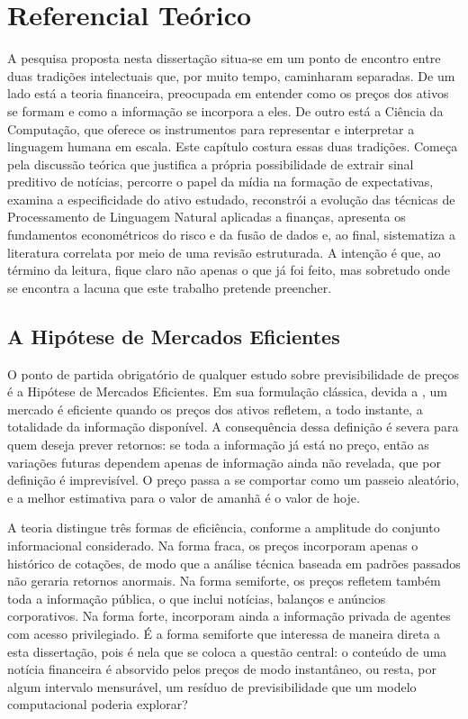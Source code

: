 \chapter{Referencial Teórico} \label{chap:referencial_teorico}

A pesquisa proposta nesta dissertação situa-se em um ponto de encontro entre duas tradições intelectuais que, por muito tempo, caminharam separadas. De um lado está a teoria financeira, preocupada em entender como os preços dos ativos se formam e como a informação se incorpora a eles. De outro está a Ciência da Computação, que oferece os instrumentos para representar e interpretar a linguagem humana em escala. Este capítulo costura essas duas tradições. Começa pela discussão teórica que justifica a própria possibilidade de extrair sinal preditivo de notícias, percorre o papel da mídia na formação de expectativas, examina a especificidade do ativo estudado, reconstrói a evolução das técnicas de Processamento de Linguagem Natural aplicadas a finanças, apresenta os fundamentos econométricos do risco e da fusão de dados e, ao final, sistematiza a literatura correlata por meio de uma revisão estruturada. A intenção é que, ao término da leitura, fique claro não apenas o que já foi feito, mas sobretudo onde se encontra a lacuna que este trabalho pretende preencher.

\section{A Hipótese de Mercados Eficientes}

O ponto de partida obrigatório de qualquer estudo sobre previsibilidade de preços é a Hipótese de Mercados Eficientes. Em sua formulação clássica, devida a , um mercado é eficiente quando os preços dos ativos refletem, a todo instante, a totalidade da informação disponível. A consequência dessa definição é severa para quem deseja prever retornos: se toda a informação já está no preço, então as variações futuras dependem apenas de informação ainda não revelada, que por definição é imprevisível. O preço passa a se comportar como um passeio aleatório, e a melhor estimativa para o valor de amanhã é o valor de hoje.

A teoria distingue três formas de eficiência, conforme a amplitude do conjunto informacional considerado. Na forma fraca, os preços incorporam apenas o histórico de cotações, de modo que a análise técnica baseada em padrões passados não geraria retornos anormais. Na forma semiforte, os preços refletem também toda a informação pública, o que inclui notícias, balanços e anúncios corporativos. Na forma forte, incorporam ainda a informação privada de agentes com acesso privilegiado. É a forma semiforte que interessa de maneira direta a esta dissertação, pois é nela que se coloca a questão central: o conteúdo de uma notícia financeira é absorvido pelos preços de modo instantâneo, ou resta, por algum intervalo mensurável, um resíduo de previsibilidade que um modelo computacional poderia explorar?

